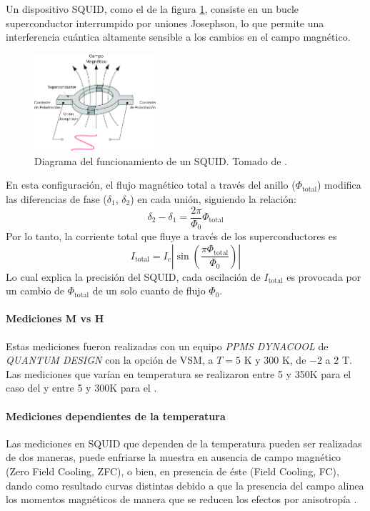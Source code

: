 \documentclass[../main.tex]{subfiles}
\begin{document}
Un dispositivo SQUID, como el de la figura \ref{fig:squiddiag}, consiste en un bucle superconductor interrumpido por uniones Josephson, lo que permite una interferencia cuántica altamente sensible a los cambios en el campo magnético.

\begin{figure}[H]
    \centering
    \includegraphics[width=0.4\textwidth]{fig/squiddiag.png}
    \caption{Diagrama del funcionamiento de un SQUID. Tomado de \cite{Marcon2012}.}
    \label{fig:squiddiag}
\end{figure}
En esta configuración, el flujo magnético total a través del anillo ($\Phi_\text{total}$) modifica las diferencias de fase ($\delta_1$, $\delta_2$) en cada unión, siguiendo la relación:
\begin{equation}
    \delta_2-\delta_1=\dfrac{2\pi}{\Phi_0}\Phi_\text{total}
    \label{eq:flujoSQUID}
\end{equation}
Por lo tanto, la corriente total que fluye a través de los superconductores es
\begin{equation}
    I_\text{total}=I_c\left|\sin\left(\dfrac{\pi\Phi_\text{total}}{\Phi_0}\right)\right|
    \label{eq:corrienteSQUID}
\end{equation}
Lo cual explica la precisión del SQUID, cada oscilación de $I_\text{total}$ es provocada por un cambio de $\Phi_\text{total}$ de un solo cuanto de flujo $\Phi_0$.
\paragraph{Mediciones M vs H}
Estas mediciones fueron realizadas con un equipo \textit{PPMS DYNACOOL} de \textit{QUANTUM DESIGN} con la opción de VSM, a $T=5$ K y $300$ K, de $-2$ a $2$ T.
Las mediciones que varían en temperatura se realizaron entre 5 y 350K para el caso del \sama{} y entre 5 y 300K para el \neod{}.
\paragraph{Mediciones dependientes de la temperatura}
Las mediciones en SQUID que dependen de la temperatura pueden ser realizadas de dos maneras, puede enfriarse la muestra en ausencia de campo magnético (Zero Field Cooling, ZFC), o bien, en presencia de éste (Field Cooling, FC), dando como resultado curvas distintas debido a que la presencia del campo alinea los momentos magnéticos de manera que se reducen los efectos por anisotropía \cite{Ali2014}.
\end{document}
